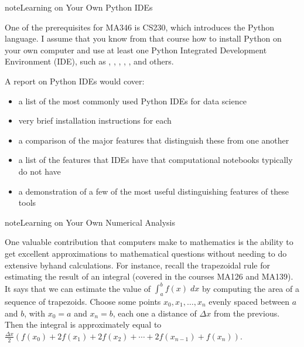 \documentclass[letterpaper,10pt,english]{sphinxmanual}
\begin{document}
\begin{sphinxadmonition}{note}{Learning on Your Own \sphinxhyphen{} Python IDEs}

One of the prerequisites for MA346 is CS230, which introduces the Python language.  I assume that you know from that course how to install Python on your own computer and use at least one Python Integrated Development Environment (IDE), such as , , , , , and others.
\end{sphinxadmonition}

A report on Python IDEs would cover:
\begin{itemize}
\item {} 
a list of the most commonly used Python IDEs for data science

\item {} 
very brief installation instructions for each

\item {} 
a comparison of the major features that distinguish these from one another

\item {} 
a list of the features that IDEs have that computational notebooks typically do not have

\item {} 
a demonstration of a few of the most useful distinguishing features of these tools

\end{itemize}

\begin{sphinxadmonition}{note}{Learning on Your Own \sphinxhyphen{} Numerical Analysis}

One valuable contribution that computers make to mathematics is the ability to get excellent approximations to mathematical questions without needing to do extensive by\sphinxhyphen{}hand calculations.  For instance, recall the trapezoidal rule for estimating the result of an integral (covered in the courses MA126 and MA139).  It says that we can estimate the value of
\(\int_a^b f(x)\;dx\)
by computing the area of a sequence of trapezoids.  Choose some points \(x_0,x_1,\ldots,x_n\) evenly spaced between \(a\) and \(b\), with \(x_0=a\) and \(x_n=b\), each one a distance of \(\Delta x\) from the previous.  Then the integral is approximately equal to
\(\frac{\Delta x}{2}\left(f(x_0)+2f(x_1)+2f(x_2)+\cdots+2f(x_{n-1})+f(x_n)\right)\).
\end{sphinxadmonition}
\end{document}
